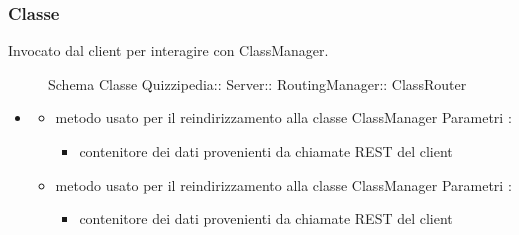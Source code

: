 \subsubsection{Classe }
Invocato dal client per interagire con ClassManager.
\begin{figure}[H]
\centering
\noindent{}
\caption[Schema Classe ClassRouter]{Schema Classe Quizzipedia:: Server:: RoutingManager:: ClassRouter}
\end{figure}
\begin{itemize}
\item {}
\begin{itemize}
\item {}
\newline
metodo usato per il reindirizzamento alla classe ClassManager
\newline
Parametri :
\begin{itemize}
\item {}
\newline
contenitore dei dati provenienti da chiamate REST del client
\end{itemize}
\item {}
\newline
metodo usato per il reindirizzamento alla classe ClassManager
\newline
Parametri :
\begin{itemize}
\item {}
\newline
contenitore dei dati provenienti da chiamate REST del client
\end{itemize}
\end{itemize}
\end{itemize}
